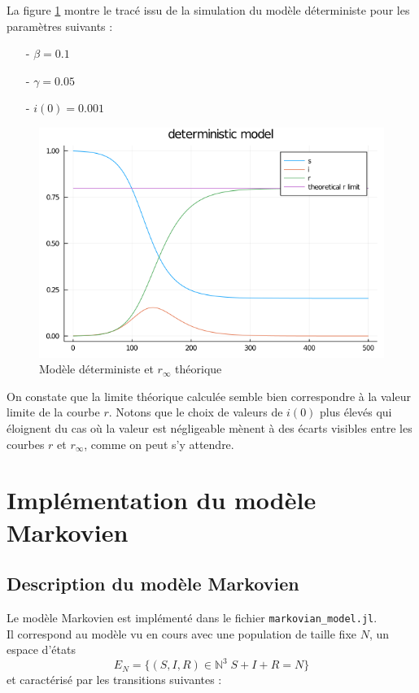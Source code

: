 \documentclass[12pt]{extarticle}
\begin{document}
\bigskip

La figure \ref{fig:deterministic} montre le tracé issu de la simulation du modèle déterministe pour les paramètres suivants : 
\begin{itemize}
    \item[-] $\beta = 0.1$
    \item[-] $\gamma = 0.05$
    \item[-] $i(0) = 0.001$ 
\end{itemize}

\begin{figure}[h!]
    \begin{center}
        \includegraphics[width=0.5\linewidth]{figures/deterministic.png}
        \caption{Modèle déterministe et $r_\infty$ théorique}
        \label{fig:deterministic}
    \end{center}
\end{figure}

\bigskip

On constate que la limite théorique calculée semble bien correspondre à la valeur limite de la courbe $r$.
Notons que le choix de valeurs de $i(0)$ plus élevés qui éloignent du cas où la valeur est négligeable mènent à des écarts visibles entre les courbes $r$ et $r_\infty$, comme on peut s'y attendre.

\section{Implémentation du modèle Markovien}

\subsection{Description du modèle Markovien}

Le modèle Markovien est implémenté dans le fichier \texttt{markovian\_model.jl}.\\
Il correspond au modèle vu en cours avec une population de taille fixe $N$, un espace d'états 
$$E_N = \{(S, I, R) \in \mathbb{N}^3 \; S+I+R = N\}$$ 
et caractérisé par les transitions suivantes : 
\end{document}
